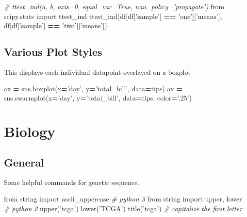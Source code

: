 \documentclass[]{book}
\newenvironment{Shaded}{\begin{snugshade}}{\end{snugshade}}
\newcommand{\StringTok}[1]{\textcolor[rgb]{0.31,0.60,0.02}{#1}}
\newcommand{\ImportTok}[1]{#1}
\newcommand{\CommentTok}[1]{\textcolor[rgb]{0.56,0.35,0.01}{\textit{#1}}}
\newcommand{\OperatorTok}[1]{\textcolor[rgb]{0.81,0.36,0.00}{\textbf{#1}}}
\newcommand{\NormalTok}[1]{#1}
\begin{document}
\begin{Shaded}
\begin{Highlighting}[]
\CommentTok{# ttest_ind(a, b, axis=0, equal_var=True, nan_policy='propagate')}
\ImportTok{from}\NormalTok{ scipy.stats }\ImportTok{import}\NormalTok{ ttest_ind}
\NormalTok{ttest_ind(df[df[}\StringTok{'sample'}\NormalTok{] }\OperatorTok{==} \StringTok{'one'}\NormalTok{][}\StringTok{'means'}\NormalTok{], df[df[}\StringTok{'sample'}\NormalTok{] }\OperatorTok{==} \StringTok{'two'}\NormalTok{][}\StringTok{'means'}\NormalTok{])}
\end{Highlighting}
\end{Shaded}

\section{Various Plot Styles}\label{various-plot-styles}

This displays each individual datapoint overlayed on a boxplot

\begin{Shaded}
\begin{Highlighting}[]
\NormalTok{ax }\OperatorTok{=}\NormalTok{ sns.boxplot(x}\OperatorTok{=}\StringTok{'day'}\NormalTok{, y}\OperatorTok{=}\StringTok{'total_bill'}\NormalTok{, data}\OperatorTok{=}\NormalTok{tips)}
\NormalTok{ax }\OperatorTok{=}\NormalTok{ sns.swarmplot(x}\OperatorTok{=}\StringTok{'day'}\NormalTok{, y}\OperatorTok{=}\StringTok{'total_bill'}\NormalTok{, data}\OperatorTok{=}\NormalTok{tips, color}\OperatorTok{=}\StringTok{'.25'}\NormalTok{)}
\end{Highlighting}
\end{Shaded}

\chapter{Biology}\label{biology}

\section{General}\label{general-1}

Some helpful commands for genetic sequence.

\begin{Shaded}
\begin{Highlighting}[]
\ImportTok{from}\NormalTok{ string }\ImportTok{import}\NormalTok{ ascii_uppercase }\CommentTok{# python 3}
\ImportTok{from}\NormalTok{ string }\ImportTok{import}\NormalTok{ upper, lower }\CommentTok{# python 2}
\NormalTok{upper(}\StringTok{'tcga'}\NormalTok{)}
\NormalTok{lower(}\StringTok{'TCGA'}\NormalTok{)}
\NormalTok{title(}\StringTok{'tcga'}\NormalTok{) }\CommentTok{# capitalize the first letter}
\end{Highlighting}
\end{Shaded}
\end{document}
